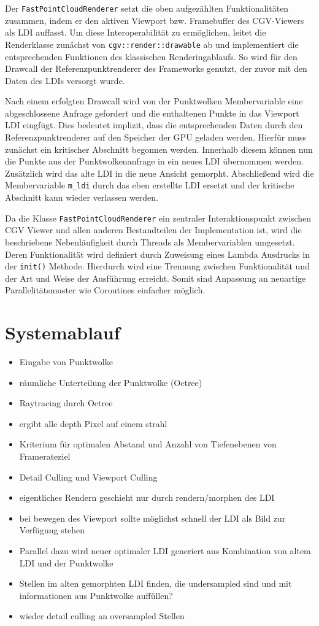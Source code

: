 \documentclass[hyperref, beleg, german]{cgvpub}
\begin{document}
Der \texttt{FastPointCloudRenderer} setzt die oben aufgezählten
Funktionalitäten zusammen, indem er den aktiven Viewport bzw. Framebuffer des
CGV-Viewers als LDI auffasst. Um diese Interoperabilität zu ermöglichen, leitet
die Renderklasse zunächst von \texttt{cgv::render::drawable} ab und
implementiert die entsprechenden Funktionen des klassischen Renderingablaufs.
So wird für den Drawcall der Referenzpunktrenderer des Frameworks genutzt, der
zuvor mit den Daten des LDIs versorgt wurde.

Nach einem erfolgten Drawcall wird von der Punktwolken Membervariable eine
abgeschlossene Anfrage gefordert und die enthaltenen Punkte in das Viewport LDI
eingfügt. Dies bedeutet implizit, dass die entsprechenden Daten durch den
Referenzpunktrenderer auf den Speicher der GPU geladen werden. Hierfür muss
zunächst ein kritischer Abschnitt begonnen werden. Innerhalb diesem können nun
die Punkte aus der Punktwolkenanfrage in ein neues LDI übernommen werden.
Zusätzlich wird das alte LDI in die neue Ansicht gemorpht. Abschließend wird die
Membervariable \texttt{m\_ldi} durch das eben erstellte LDI ersetzt und der
kritische Abschnitt kann wieder verlassen werden.

Da die Klasse \texttt{FastPointCloudRenderer} ein zentraler Interaktionspunkt
zwischen CGV Viewer und allen anderen Bestandteilen der Implementation ist, wird
die beschriebene Nebenläufigkeit durch Threads als Membervariablen umgesetzt.
Deren Funktionalität wird definiert durch Zuweisung eines Lambda Ausdrucks in
der \texttt{init()} Methode. Hierdurch wird eine Trennung zwischen
Funktionalität und der Art und Weise der Ausführung erreicht. Somit sind
Anpassung an neuartige Parallelitätsmuster wie Coroutines einfacher möglich.

\section{Systemablauf}

\begin{itemize}
	\item Eingabe von Punktwolke
	\item räumliche Unterteilung der Punktwolke (Octree)
	\item Raytracing durch Octree
	\item ergibt alle depth Pixel auf einem strahl
	\item Kriterium für optimalen Abstand und Anzahl von Tiefenebenen von Framerateziel
	\item Detail Culling und Viewport Culling
	\item eigentliches Rendern geschieht nur durch rendern/morphen des LDI
	\item bei bewegen des Viewport sollte möglichst schnell der LDI als Bild zur Verfügung stehen
	\item Parallel dazu wird neuer optimaler LDI generiert aus Kombination von altem LDI und der Punktwolke
	\item Stellen im alten gemorphten LDI finden, die undersampled sind und mit informationen aus Punktwolke auffüllen?
	\item wieder detail culling an oversampled Stellen
\end{itemize}
\end{document}
